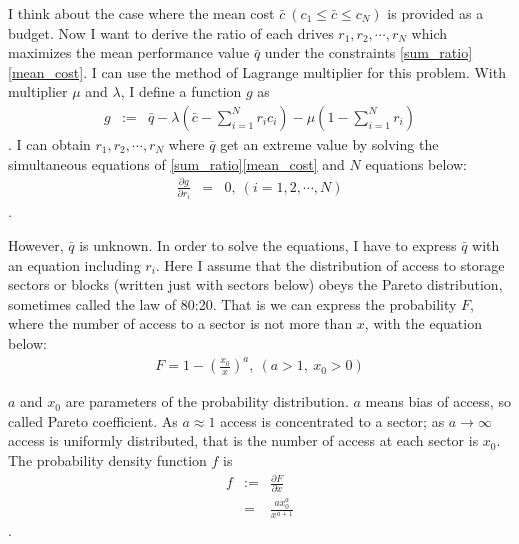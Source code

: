 \documentclass[a4paper,11pt]{article}
\begin{document}
I think about the case where the mean cost $\bar{c}\ (c_1 \leq \bar{c} \leq c_N)$ is provided as a budget.
Now I want to derive the ratio of each drives $r_1, r_2, \cdots, r_N$ which maximizes the mean performance value $\bar{q}$ under the constraints \eqref{sum_ratio}\eqref{mean_cost}.
I can use the method of Lagrange multiplier for this problem.
With multiplier $\mu$ and $\lambda$, I define a function $g$ as
\begin{eqnarray}
g&:=&\bar{q} - \lambda \left( \bar{c} - \sum_{i=1}^{N} r_i c_i \right) 
-\mu \left( 1- \sum_{i=1}^N r_i \right)
\end{eqnarray}
.
I can obtain $r_1, r_2, \cdots ,r_N$ where $\bar{q}$ get an extreme value by solving the simultaneous equations of \eqref{sum_ratio}\eqref{mean_cost} and $N$ equations below:
\begin{eqnarray}
\frac{\partial g}{\partial r_i} &=& 0
  ,\ (i = 1, 2, \cdots , N)
  \label{lagrange_theory}
\end{eqnarray}
.

However, $\bar{q}$ is unknown. In order to solve the equations, I have to express $\bar{q}$ with an equation including $r_i$.
Here I assume that the distribution of access to storage sectors or blocks (written just with sectors below) obeys the Pareto distribution, sometimes called the law of 80:20.
That is we can express the probability $F$, where the number of access to a sector is not more than $x$, with the equation below: 
\begin{eqnarray}
F=1-\left(\frac{x_0}{x}\right)^a,\ (a > 1,\ x_0 > 0)
\end{eqnarray}

$a$ and $x_0$ are parameters of the probability distribution.
$a$ means bias of access, so called Pareto coefficient.
As $a \approx 1$ access is concentrated to a sector;
as $a \to \infty$ access is uniformly distributed, that is the number of access at each sector is $x_0$. The probability density function $f$ is 
\begin{eqnarray}
f &:=& \frac{\partial F}{\partial x}\nonumber\\
  &=& \frac{a x_0^a}{x^{a+1}}
\end{eqnarray}
.
\end{document}
